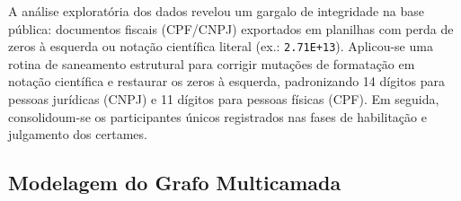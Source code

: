 A análise exploratória dos dados revelou um gargalo de integridade na base pública: documentos fiscais (CPF/CNPJ) exportados em planilhas com perda de zeros à esquerda ou notação científica literal (ex.: \texttt{2.71E+13}).  %
Aplicou-se uma rotina de saneamento estrutural para corrigir mutações de formatação em notação científica  e restaurar os zeros à esquerda, padronizando 14 dígitos para pessoas jurídicas (CNPJ) e 11 dígitos para pessoas físicas (CPF). Em seguida, consolidoum-se os participantes únicos registrados nas fases de habilitação e julgamento dos certames.

\subsection{Modelagem do Grafo Multicamada}



